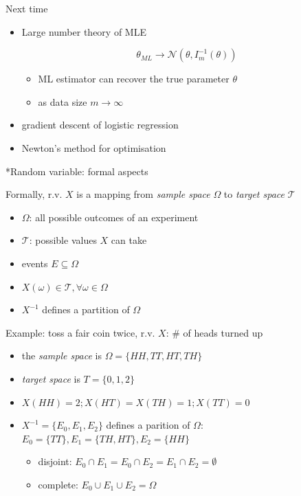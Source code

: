 \documentclass[ignorenonframetext,]{beamer}
\providecommand{\tightlist}{%
  \setlength{\itemsep}{0pt}\setlength{\parskip}{0pt}}
\begin{document}
\begin{frame}{Next time}
\protect\hypertarget{next-time}{}

\begin{itemize}
\item
  Large number theory of MLE

  \[\theta_{ML} \rightarrow \mathcal{N}(\theta, I_m^{-1}(\theta))\]

  \begin{itemize}
  \tightlist
  \item
    ML estimator can recover the true parameter \(\theta\)
  \item
    as data size \({m\rightarrow \infty}\)
  \end{itemize}
\item
  gradient descent of logistic regression
\item
  Newton's method for optimisation
\end{itemize}

\end{frame}

\begin{frame}{*Random variable: formal aspects}
\protect\hypertarget{random-variable-formal-aspects}{}

Formally, r.v. \(X\) is a mapping from \emph{sample space} \(\Omega\) to
\emph{target space} \(\mathcal{T}\)

\begin{itemize}
\tightlist
\item
  \(\Omega\): all possible outcomes of an experiment
\item
  \(\mathcal{T}\): possible values \(X\) can take
\item
  events \(E\subseteq \Omega\)
\item
  \(X(\omega) \in \mathcal{T}, \forall \omega \in \Omega\)
\item
  \(X^{-1}\) defines a partition of \(\Omega\) 
\end{itemize}

Example: toss a fair coin twice, r.v. \(X\): \# of heads turned up

\begin{itemize}
\tightlist
\item
  the \emph{sample space} is \(\Omega =\{HH, TT, HT, TH\}\)
\item
  \emph{target space} is \(T =\{0,1,2\}\)
\item
  \(X(HH) = 2; X(HT)=X(TH)=1; X(TT) =0\)
\item
  \(X^{-1} = \{E_0, E_1, E_2\}\) defines a parition of \(\Omega\):
  \(E_0=\{TT\}, E_1=\{TH,HT\}, E_2=\{HH\}\)

  \begin{itemize}
  \tightlist
  \item
    disjoint: \(E_0 \cap E_1 = E_0 \cap E_2= E_1 \cap E_2 = \emptyset\)
  \item
    complete: \(E_0 \cup E_1 \cup E_2 = \Omega\)
  \end{itemize}
\end{itemize}

\end{frame}
\end{document}
